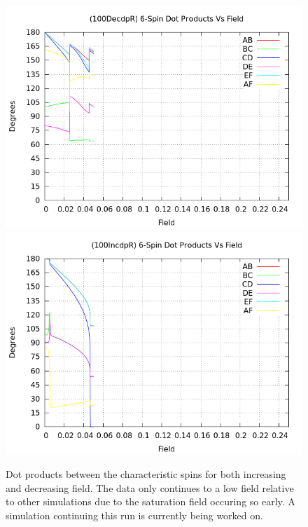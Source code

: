 \documentclass{article}
\begin{document}
\begin{figure}[ht]
\centering
\includegraphics[scale=0.5]{HVariedData/Pictures/100DecdpR.png}
\includegraphics[scale=0.5]{HVariedData/Pictures/100IncdpR.png}
\caption{Dot products between the characteristic spins for both increasing and decreasing field. The data only continues
to a low field relative to other simulations due to the saturation field occuring so early. A simulation continuing
this run is currently being worked on.}
\end{figure}
\clearpage
\end{document}

